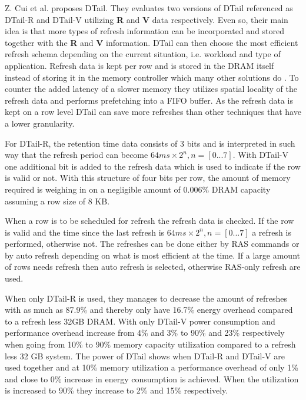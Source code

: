 Z. Cui et al. \cite{dtail} proposes DTail. They evaluates two versions of DTail referenced as DTail-R and DTail-V utilizing \textbf{R} and \textbf{V} data respectively. Even so, their main idea is that more types of refresh information can be incorporated and stored together with the \textbf{R} and \textbf{V} information. DTail can then choose the most efficient refresh schema depending on the current situation, i.e. workload and type of application. Refresh data is kept per row and is stored in the DRAM itself instead of storing it in the memory controller which many other solutions do \cite{raidr}\cite{smartrefresh}\cite{refrint}. To counter the added latency of a slower memory they utilizes spatial locality of the refresh data and performs prefetching into a FIFO buffer. As the refresh data is kept on a row level DTail can save more refreshes than other techniques that have a lower granularity.

For DTail-R, the retention time data consists of 3 bits and is interpreted in such way that the refresh period can become \(64ms \times 2^n, n = [0...7]\). With DTail-V one additional bit is added to the refresh data which is used to indicate if the row is valid or not. With this structure of four bits per row, the amount of memory required is weighing in on a negligible amount of 0.006\% DRAM capacity assuming a row size of 8 KB. 

When a row is to be scheduled for refresh the refresh data is checked. If the row is valid and the time since the last refresh is \(64ms \times 2^n, n = [0...7]\) a refresh is performed, otherwise not. The refreshes can be done either by RAS commands or by auto refresh depending on what is most efficient at the time. If a large amount of rows needs refresh then auto refresh is selected, otherwise RAS-only refresh are used. 

When only DTail-R is used, they manages to decrease the amount of refreshes with as much as 87.9\% and thereby only have 16.7\% energy overhead compared to a refresh less 32GB DRAM. With only DTail-V power consumption and performance overhead increase from 4\% and 3\% to 90\% and 23\% respectively when going from 10\% to 90\% memory capacity utilization compared to a refresh less 32 GB system. The power of DTail shows when DTail-R and DTail-V are used together and at 10\% memory utilization a performance overhead of only 1\% and close to 0\% increase in energy consumption is achieved. When the utilization is increased to 90\% they increase to 2\% and 15\% respectively.